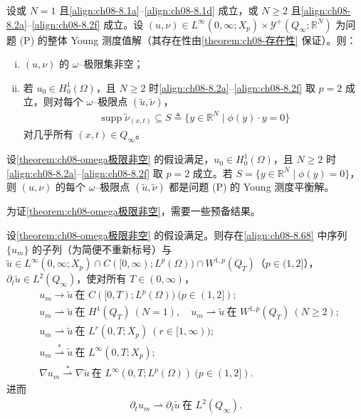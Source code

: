 \documentclass[../../main.tex]{subfiles}%
\begin{document}
\begin{theorem}\label{theorem:ch08-omega极限非空}
设或 $N=1$ 且\eqref{align:ch08-8.1a}--\eqref{align:ch08-8.1d} 成立，或 $N\geqslant2$ 且\eqref{align:ch08-8.2a}--\eqref{align:ch08-8.2f} 成立。设 $(u,\nu)\in L^\infty(0,\infty;X_p)\times\mathcal{Y}^+(Q_\infty;\mathbb{R}^N)$ 为问题 (P) 的整体 Young 测度值解（其存在性由\cref{theorem:ch08-存在性} 保证）。则：
\begin{enumerate}[(i)]
\item\label{item:ch08-omega-thm-i} $(u,\nu)$ 的 $\omega$--极限集非空；
\item\label{item:ch08-omega-thm-ii} 若 $u_0\in H^1_0(\Omega)$，且 $N\geqslant2$ 时\eqref{align:ch08-8.2a}--\eqref{align:ch08-8.2f} 取 $p=2$ 成立，则对每个 $\omega$--极限点 $(\tilde u,\tilde\nu)$，
\begin{align}
\operatorname{supp}\tilde\nu_{(x,t)}\subseteq S\triangleq \{y\in\mathbb{R}^N\mid\phi(y)\cdot y=0\} \label{align:ch08-8.69}
\end{align}
对几乎所有 $(x,t)\in Q_\infty$。
\end{enumerate}
\end{theorem}

\begin{theorem}\label{theorem:ch08-平衡解}
设\cref{theorem:ch08-omega极限非空} 的假设满足，$u_0\in H^1_0(\Omega)$，且 $N\geqslant2$ 时\eqref{align:ch08-8.2a}--\eqref{align:ch08-8.2f} 取 $p=2$ 成立。若 $S=\{y\in\mathbb{R}^N\mid\phi(y)=0\}$，则 $(u,\nu)$ 的每个 $\omega$--极限点 $(\tilde u,\tilde\nu)$ 都是问题 (P) 的 Young 测度平衡解。
\end{theorem}

为证\cref{theorem:ch08-omega极限非空}，需要一些预备结果。

\begin{lemma}\label{lemma:ch08-u_m收敛}
设\cref{theorem:ch08-omega极限非空} 的假设满足。则存在\eqref{align:ch08-8.68} 中序列 $\{u_m\}$ 的子列（为简便不重新标号）与 $\tilde u\in L^\infty(0,\infty;X_p)\cap C([0,\infty);L^p(\Omega))\cap W^{1,p}(Q_T)$（$p\in(1,2]$），$\partial_t\tilde u\in L^2(Q_\infty)$，使对所有 $T\in(0,\infty)$，
\begin{align}
&u_m\to\tilde u\ \text{在 }C([0,T);L^p(\Omega))\ (p\in(1,2]); \label{align:ch08-8.70a}\\
&u_m\rightharpoonup\tilde u\ \text{在 }H^1(Q_T)\ (N=1),\quad
u_m\rightharpoonup\tilde u\ \text{在 }W^{1,p}(Q_T)\ (N\geqslant2); \label{align:ch08-8.70b}\\
&u_m\rightharpoonup\tilde u\ \text{在 }L^r(0,T;X_p)\ (r\in[1,\infty)); \label{align:ch08-8.70c}\\
&u_m\stackrel{*}{\rightharpoonup}\tilde u\ \text{在 }L^\infty(0,T;X_p); \label{align:ch08-8.70d}\\
&\nabla u_m\stackrel{*}{\rightharpoonup}\nabla\tilde u\ \text{在 }L^\infty(0,T;L^p(\Omega))\ (p\in(1,2]). \label{align:ch08-8.70e}
\end{align}
进而
\begin{align}
\partial_t u_m\rightharpoonup\partial_t\tilde u\ \text{在 }L^2(Q_\infty). \label{align:ch08-8.70f}
\end{align}
\end{lemma}
\end{document}

